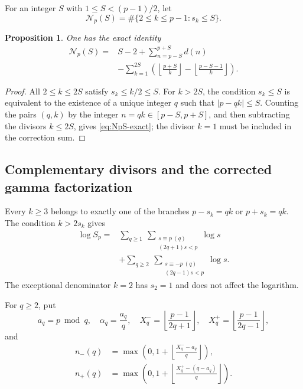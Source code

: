 \documentclass[11pt]{amsart}
\numberwithin{equation}{section}
\newtheorem{proposition}[theorem]{Proposition}
\theoremstyle{definition}
\theoremstyle{remark}
\begin{document}
For an integer \(S\) with \(1\le S<(p-1)/2\), let
\begin{equation}\label{eq:NpS-def}
 \mathcal N_p(S)=\#\{2\le k\le p-1:s_k\le S\}.
\end{equation}

\begin{proposition}\label{prop:NpS-exact}
One has the exact identity
\begin{equation}\label{eq:NpS-exact}
\begin{aligned}
 \mathcal N_p(S)
={}&S-2+\sum_{n=p-S}^{p+S}d(n)\\
&-\sum_{k=1}^{2S}
 \left(\left\lfloor\frac{p+S}{k}\right\rfloor
       -\left\lfloor\frac{p-S-1}{k}\right\rfloor\right).
\end{aligned}
\end{equation}
\end{proposition}

\begin{proof}
All \(2\le k\le2S\) satisfy \(s_k\le k/2\le S\).  For \(k>2S\), the
condition \(s_k\le S\) is equivalent to the existence of a unique integer
\(q\) such that \(|p-qk|\le S\).  Counting the pairs \((q,k)\) by the
integer \(n=qk\in[p-S,p+S]\), and then subtracting the divisors
\(k\le2S\), gives \eqref{eq:NpS-exact}; the divisor \(k=1\) must be
included in the correction sum.
\end{proof}

\subsection{Complementary divisors and the corrected gamma factorization}

Every \(k\ge3\) belongs to exactly one of the branches
\(p-s_k=qk\) or \(p+s_k=qk\).  The condition \(k>2s_k\) gives
\begin{equation}\label{eq:Sp-progression-log}
\begin{aligned}
 \log S_p
={}&\sum_{q\ge1}\ \sum_{\substack{s\equiv p\ (q)\\(2q+1)s<p}}\log s\\
&+\sum_{q\ge2}\ \sum_{\substack{s\equiv-p\ (q)\\(2q-1)s<p}}\log s.
\end{aligned}
\end{equation}
The exceptional denominator \(k=2\) has \(s_2=1\) and does not affect the
logarithm.

For \(q\ge2\), put
\begin{equation}\label{eq:gamma-parameters}
 a_q=p\bmod q,\quad \alpha_q=\frac{a_q}{q},\quad
 X_q^- =\left\lfloor\frac{p-1}{2q+1}\right\rfloor,\quad
 X_q^+ =\left\lfloor\frac{p-1}{2q-1}\right\rfloor,
\end{equation}
and
\begin{align}
 n_-(q)&=\max\left(0,1+\left\lfloor\frac{X_q^--a_q}{q}\right\rfloor\right),
 \label{eq:nminus}\\
 n_+(q)&=\max\left(0,1+\left\lfloor\frac{X_q^+-(q-a_q)}{q}\right\rfloor\right).
 \label{eq:nplus}
\end{align}
\end{document}
